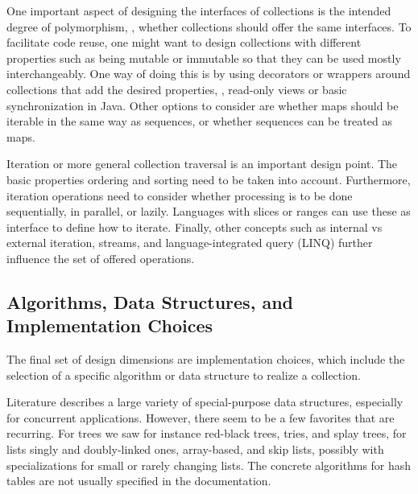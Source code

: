 \documentclass[sigconf, 10pt]{acmart}
\begin{document}

One important aspect of designing the interfaces of collections is the intended
degree of polymorphism,
\ie, whether collections should offer the same interfaces.
To facilitate code reuse, one might want to design collections
with different properties such as being mutable or immutable
so that they can be used mostly interchangeably.
One way of doing this is by using decorators or wrappers around collections
that add the desired properties, \eg, read-only views or basic synchronization in Java.
Other options to consider are whether maps should be iterable
in the same way as sequences, or whether sequences can be treated as maps.


Iteration or more general collection traversal is an important design point.
The basic properties ordering and sorting need to be taken into account.
Furthermore, iteration operations need to consider whether processing is
to be done sequentially, in parallel, or lazily.
Languages with slices or ranges can use these as interface
to define how to iterate.
Finally, other concepts such as internal vs external iteration, streams,
and language-integrated query (LINQ)
further influence the set of offered operations.

\subsection{Algorithms, Data Structures, and Implementation Choices}
\label{sec:impl-choices}

The final set of design dimensions are implementation choices,
which include the selection of a specific algorithm or data structure
to realize a collection.

Literature describes a large variety of special-purpose
data structures, especially for concurrent applications.
However, there seem to be a few favorites that are recurring.
For
trees we saw for instance red-black trees, tries, and splay trees,
for lists singly and doubly-linked ones, array-based, and skip lists,
possibly with specializations for small or rarely changing lists.
%
The concrete algorithms for hash tables are not usually specified
in the documentation.
\end{document}
